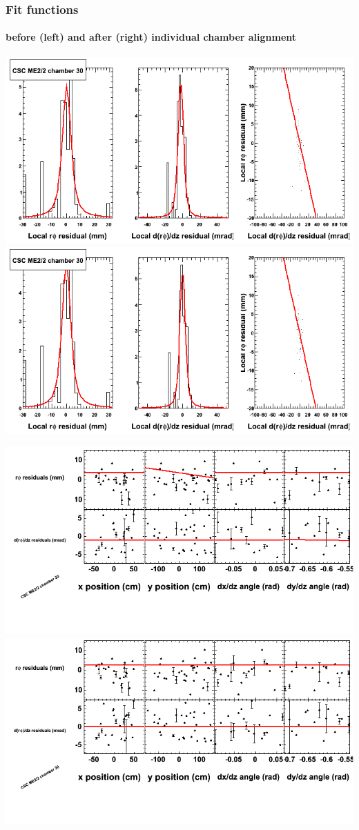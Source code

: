 \documentclass[compress]{beamer}
\begin{document}
\begin{frame}
\frametitle{Fit functions}
\framesubtitle{before (left) and after (right) individual chamber alignment}
\includegraphics[width=0.5\linewidth]{ringfits_3dof/beforefit_MEp22_30_bellcurve.png} \includegraphics[width=0.5\linewidth]{ringfits_3dof/afterfit_MEp22_30_bellcurve.png}

\includegraphics[width=0.5\linewidth]{ringfits_3dof/beforefit_MEp22_30_polynomials.png} \includegraphics[width=0.5\linewidth]{ringfits_3dof/afterfit_MEp22_30_polynomials.png}
\end{frame}
\end{document}
